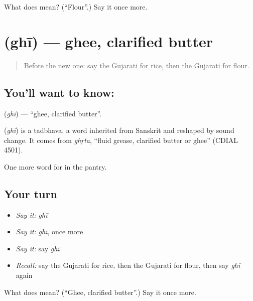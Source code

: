 \begin{tcolorbox}[breakable,colback=teal!4,colframe=teal!35!black,title={Before you move on}]
What does  mean? (\textquotedblleft{}Flour\textquotedblright{}.) Say it once more.
\end{tcolorbox}
\section[\texorpdfstring{\gu{ઘી} (ghī)}{ઘી (ghī)}]{ (ghī) — ghee, clarified butter}

\label{lesson:GU-C58-ghee}



\begin{quote}
Before the new one: say the Gujarati for rice, then the Gujarati for flour.
\end{quote}

\subsection*{You'll want to know: }
\textbf{} (\emph{ghī}) — \textquotedblleft{}ghee, clarified butter\textquotedblright{}.

\begin{cousinweb}
\textbf{} (\emph{ghī}) is a tadbhava, a word inherited from Sanskrit and reshaped by sound change. It comes from \emph{ghṛta}, \textquotedblleft{}fluid grease, clarified butter or ghee\textquotedblright{} (CDIAL 4501).
\end{cousinweb}

\begin{grammarlens}[title={What you've built}]
One more word for in the pantry.
\end{grammarlens}

\subsection*{Your turn}
\begin{itemize}
\raggedright
  \item \emph{Say it:} \emph{ghī}
  \item \emph{Say it:} \emph{ghī}, once more
  \item \emph{Say it:} say \emph{ghī}
  \item \emph{Recall:} say the Gujarati for rice, then the Gujarati for flour, then say \emph{ghī} again
\end{itemize}

\begin{tcolorbox}[breakable,colback=teal!4,colframe=teal!35!black,title={Before you move on}]
What does  mean? (\textquotedblleft{}Ghee, clarified butter\textquotedblright{}.) Say it once more.
\end{tcolorbox}
